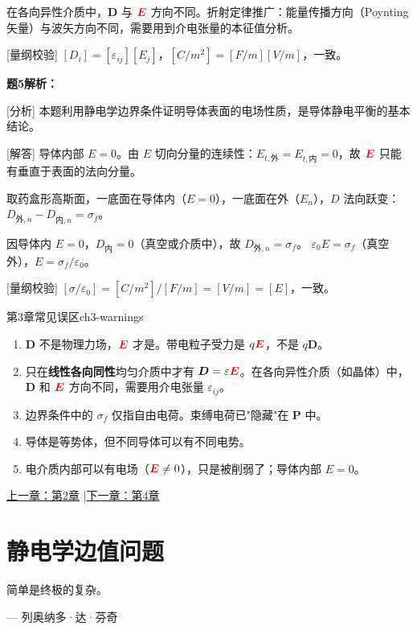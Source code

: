 \documentclass[11pt,a4paper,openany,oneside]{book}
\newcommand{\vecE}{\textcolor{red}{\vect{E}}}
\newcommand{\eps}{\varepsilon}
\newcommand{\vect}[1]{\bm{#1}}
\begin{document}
在各向异性介质中，$\vect{D}$ 与 $\vecE$ 方向不同。折射定律推广：能量传播方向（Poynting矢量）与波矢方向不同，需要用到介电张量的本征值分析。\qedsymbol

[量纲校验] $[D_i] = [\eps_{ij}][E_j]$，$[C/m^2] = [F/m][V/m]$，一致。\qedsymbol

\textbf{题5解析：}

[分析] 本题利用静电学边界条件证明导体表面的电场性质，是导体静电平衡的基本结论。

[解答] 导体内部 $E = 0$。由 $E$ 切向分量的连续性：$E_{t,\text{外}} = E_{t,\text{内}} = 0$，故 $\vecE$ 只能有垂直于表面的法向分量。

取药盒形高斯面，一底面在导体内（$E=0$），一底面在外（$E_n$），$D$ 法向跃变：$D_{\text{外},n} - D_{\text{内},n} = \sigma_f$。

因导体内 $E=0$，$D_{\text{内}} = 0$（真空或介质中），故 $D_{\text{外},n} = \sigma_f$。
$\eps_0 E = \sigma_f$（真空外），$E = \sigma_f/\eps_0$。\qedsymbol

[量纲校验] $[\sigma/\eps_0] = [C/m^2]/[F/m] = [V/m] = [E]$，一致。\qedsymbol



\begin{warning}{第3章常见误区}{ch3-warnings}
\begin{enumerate}
\item $\vect{D}$ 不是物理力场，$\vecE$ 才是。带电粒子受力是 $q\vecE$，不是 $q\vect{D}$。
\item 只在\textbf{线性各向同性}均匀介质中才有 $\vect{D} = \eps\vecE$。在各向异性介质（如晶体）中，$\vect{D}$ 和 $\vecE$ 方向不同，需要用介电张量 $\varepsilon_{ij}$。
\item 边界条件中的 $\sigma_f$ 仅指自由电荷。束缚电荷已"隐藏"在 $\vect{P}$ 中。
\item 导体是等势体，但不同导体可以有不同电势。
\item 电介质内部可以有电场（$\vecE \neq 0$），只是被削弱了；导体内部 $E=0$。
\end{enumerate}
\end{warning}


\begin{center}\small \hyperlink{ch2-goal}{上一章：第2章} \quad|\quad \hyperlink{ch4-goal}{下一章：第4章}\end{center}

\chapter{静电学边值问题}
\epigraph{简单是终极的复杂。}{--- 列奥纳多·达·芬奇}
\end{document}
